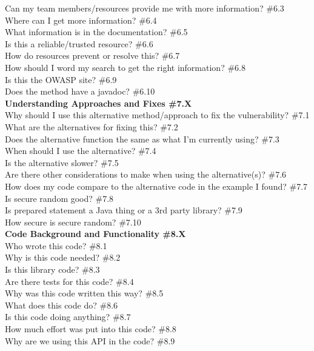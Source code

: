 \documentclass[10pt,journal,compsoc]{IEEEtran}
\begin{document}
	Can my team members/resources provide me with more information? \#6.3 \\
	Where can I get more information? \#6.4 \\
	What information is in the documentation? \#6.5 \\
	Is this a reliable/trusted resource? \#6.6 \\
	How do resources prevent or resolve this? \#6.7 \\
	How should I word my search to get the right information? \#6.8 \\
	Is this the OWASP site? \#6.9 \\
	Does the method have a javadoc? \#6.10 \\
\textbf{Understanding Approaches and Fixes  \#7.X} \\
	Why should I use this alternative method/approach to fix the vulnerability? \#7.1 \\
	What are the alternatives for fixing this? \#7.2 \\
	Does the alternative function the same as what I'm currently using? \#7.3 \\
	When should I use the alternative?  \#7.4 \\
	Is the alternative slower?  \#7.5 \\
	Are there other considerations to make when using the alternative(s)? \#7.6 \\
	How does my code compare to the alternative code in the example I found? \#7.7 \\
	Is secure random good?  \#7.8 \\
	Is prepared statement a Java thing or a 3rd party library?  \#7.9 \\
	How secure is secure random?  \#7.10 \\
\textbf{Code Background and Functionality \#8.X} \\
	Who wrote this code? \#8.1 \\
	Why is this code needed? \#8.2  \\
	Is this library code? \#8.3 \\
	Are there tests for this code?  \#8.4 \\
	Why was this code written this way? \#8.5 \\
	What does this code do? \#8.6 \\
	Is this code doing anything? \#8.7 \\
	How much effort was put into this code? \#8.8 \\
	Why are we using this API in the code? \#8.9 \\
\end{document}
